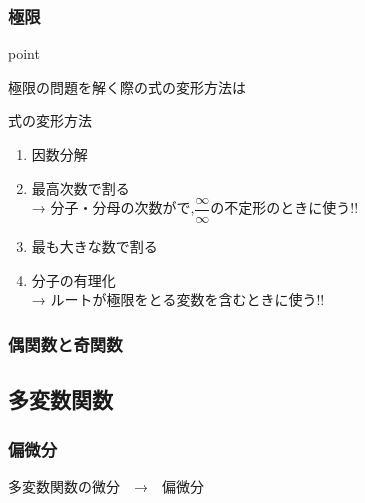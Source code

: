 \documentclass[a4paper]{jsarticle}
\begin{document}
\subsubsection{極限}
\begin{itembox}[l]{point}
    \begin{center}
        極限の問題を解く際の式の変形方法は
    \end{center}
\end{itembox}
\begin{itembox}[l]{式の変形方法}
    \begin{enumerate}[(1)]
        \item 因数分解
        \item 最高次数で割る\\
              → 分子・分母の次数がで,$\dfrac{\infty}{\infty}$の不定形のときに使う!!
        \item 最も大きな数で割る\\

        \item 分子の有理化\\
              → ルートが極限をとる変数を含むときに使う!!
    \end{enumerate}
\end{itembox}
\subsubsection{偶関数と奇関数}

\subsection{多変数関数}
\subsubsection{偏微分}
多変数関数の微分　→　偏微分
\end{document}
